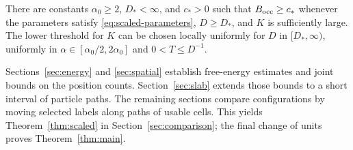 \begin{theorem}\label{thm:scaled}
There are constants $\alpha_0\ge2$, $D_*<\infty$, and $c_*>0$ such that
$B_{\rm occ}\ge c_*$ whenever the parameters satisfy
\eqref{eq:scaled-parameters}, $D\ge D_*$, and $K$ is sufficiently large.
The lower threshold for $K$ can be chosen locally uniformly for $D$ in
$[D_*,\infty)$, uniformly in $\alpha\in[\alpha_0/2,2\alpha_0]$ and
$0<T\le D^{-1}$.
\end{theorem}

Sections~\ref{sec:energy} and \ref{sec:spatial} establish free-energy
estimates and joint bounds on the position counts. Section~\ref{sec:slab}
extends those bounds to a short interval of particle paths. The remaining
sections compare configurations by moving selected labels along paths of
usable cells. This yields Theorem~\ref{thm:scaled} in
Section~\ref{sec:comparison}; the final change of units proves
Theorem~\ref{thm:main}.
